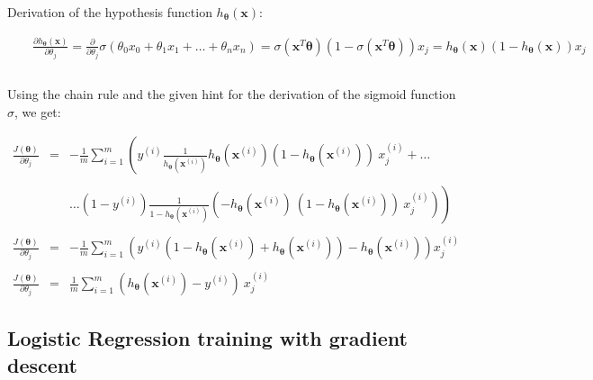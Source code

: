 \documentclass{article}
\begin{document}
Derivation of the hypothesis function $ h_{\boldsymbol{\theta}}(\boldsymbol{x}) $:\

$$\begin{array}{rccl}  

&&\frac{\partial h_{\boldsymbol{\theta}}(\boldsymbol{x})}{\partial \theta_j} = \frac{\partial}{\partial \theta_j} \sigma(\theta_0 x_0 + \theta_1 x_1 + \dots + \theta_n x_n) = \sigma(\boldsymbol{x}^T\boldsymbol{\theta})\left(1-\sigma(\boldsymbol{x}^T\boldsymbol{\theta})\right)x_j = h_{\boldsymbol{\theta}}(\boldsymbol{x})\left(1-h_{\boldsymbol{\theta}}(\boldsymbol{x})\right)x_j&\\\\
\end{array}$$

Using the chain rule and the given hint for the derivation of the sigmoid function $\sigma$, we get:

$$\begin{array}{rccl}       
    \frac{J(\boldsymbol{\theta})}{\partial \theta_j} & = & -\frac{1}{m} \displaystyle \sum_{i=1}^{m}\left( y^{(i)} \frac{1}{h_{\boldsymbol{\theta}}(\boldsymbol{x}^{(i)})} h_{\boldsymbol{\theta}}(\boldsymbol{x}^{(i)}) \left(1 - h_{\boldsymbol{\theta}}(\boldsymbol{x}^{(i)})\right) \ x^{(i)}_j + \dots \right.  &  \\\\
    & & \left. \dots (1 - y^{(i)}) \frac{1}{1 - h_{\boldsymbol{\theta}}(\boldsymbol{x}^{(i)})} \left(-h_{\boldsymbol{\theta}}(\boldsymbol{x}^{(i)}) \ (1 - h_{\boldsymbol{\theta}}(\boldsymbol{x}^{(i)})) \ x^{(i)}_j\right) \right) \\\\
    \frac{J(\boldsymbol{\theta})}{\partial \theta_j} & = & -\frac{1}{m} \displaystyle \sum_{i=1}^{m}\left(y^{(i)} (1 - h_{\boldsymbol{\theta}}(\boldsymbol{x}^{(i)}) + h_{\boldsymbol{\theta}}(\boldsymbol{x}^{(i)})) - h_{\boldsymbol{\theta}}(\boldsymbol{x}^{(i)}) \right) x^{(i)}_j & \\\\
    \frac{J(\boldsymbol{\theta})}{\partial \theta_j} & = & \frac{1}{m} \displaystyle \sum_{i=1}^{m} \left(h_{\boldsymbol{\theta}}(\boldsymbol{x}^{(i)})-y^{(i)}\right) \ x^{(i)}_j
    
\end{array}$$

\newpage

\subsection{Logistic Regression training with gradient descent}
\end{document}
